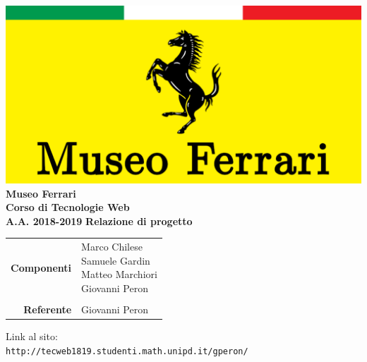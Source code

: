 


\begin{titlepage}
\thispagestyle{empty}

\begin{center}

\includegraphics[scale=0.25]{Images/logo.pdf}\\ 
\large \textbf{Museo Ferrari\\ \small Corso di Tecnologie Web\\ A.A. 2018-2019}
\vfill
\Huge \textbf{Relazione di progetto}
\vfill
\large
\renewcommand{\arraystretch}{1.3}
\begin{tabular}{r|l}
\textbf{Componenti} & \parbox[t]{5cm}{Marco Chilese\\Samuele Gardin\\Matteo Marchiori\\Giovanni Peron}\\
\-\\
\textbf{Referente} & \parbox[t]{5cm}{Giovanni Peron}\\
\end{tabular}
\vfill
\small
Link al sito:\\
\texttt{http://tecweb1819.studenti.math.unipd.it/gperon/}
\end{center}
\end{titlepage}

\pagebreak

\tableofcontents

\pagebreak




\pagebreak



\pagebreak



\pagebreak



\pagebreak




\pagebreak




